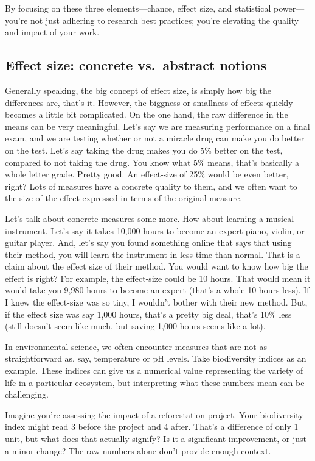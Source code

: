 \documentclass[
  letterpaper,
  DIV=11,
  numbers=noendperiod]{scrreprt}
\begin{document}
By focusing on these three elements---chance, effect size, and
statistical power---you're not just adhering to research best practices;
you're elevating the quality and impact of your work.

\subsection{Effect size: concrete vs.~abstract
notions}\label{effect-size-concrete-vs.-abstract-notions}

Generally speaking, the big concept of effect size, is simply how big
the differences are, that's it. However, the biggness or smallness of
effects quickly becomes a little bit complicated. On the one hand, the
raw difference in the means can be very meaningful. Let's say we are
measuring performance on a final exam, and we are testing whether or not
a miracle drug can make you do better on the test. Let's say taking the
drug makes you do 5\% better on the test, compared to not taking the
drug. You know what 5\% means, that's basically a whole letter grade.
Pretty good. An effect-size of 25\% would be even better, right? Lots of
measures have a concrete quality to them, and we often want to the size
of the effect expressed in terms of the original measure.

Let's talk about concrete measures some more. How about learning a
musical instrument. Let's say it takes 10,000 hours to become an expert
piano, violin, or guitar player. And, let's say you found something
online that says that using their method, you will learn the instrument
in less time than normal. That is a claim about the effect size of their
method. You would want to know how big the effect is right? For example,
the effect-size could be 10 hours. That would mean it would take you
9,980 hours to become an expert (that's a whole 10 hours less). If I
knew the effect-size was so tiny, I wouldn't bother with their new
method. But, if the effect size was say 1,000 hours, that's a pretty big
deal, that's 10\% less (still doesn't seem like much, but saving 1,000
hours seems like a lot).

In environmental science, we often encounter measures that are not as
straightforward as, say, temperature or pH levels. Take biodiversity
indices as an example. These indices can give us a numerical value
representing the variety of life in a particular ecosystem, but
interpreting what these numbers mean can be challenging.

Imagine you're assessing the impact of a reforestation project. Your
biodiversity index might read 3 before the project and 4 after. That's a
difference of only 1 unit, but what does that actually signify? Is it a
significant improvement, or just a minor change? The raw numbers alone
don't provide enough context.
\end{document}

